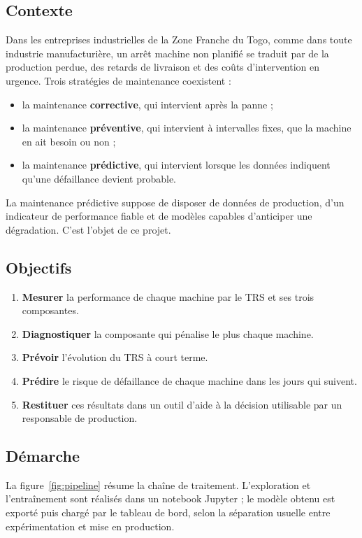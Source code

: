 \documentclass[11pt,a4paper]{article}
\begin{document}
\subsection{Contexte}
Dans les entreprises industrielles de la Zone Franche du Togo, comme dans toute industrie
manufacturière, un arrêt machine non planifié se traduit par de la production perdue, des
retards de livraison et des coûts d'intervention en urgence. Trois stratégies de maintenance
coexistent :
\begin{itemize}
  \item la maintenance \textbf{corrective}, qui intervient après la panne ;
  \item la maintenance \textbf{préventive}, qui intervient à intervalles fixes, que la machine
        en ait besoin ou non ;
  \item la maintenance \textbf{prédictive}, qui intervient lorsque les données indiquent
        qu'une défaillance devient probable.
\end{itemize}
La maintenance prédictive suppose de disposer de données de production, d'un indicateur de
performance fiable et de modèles capables d'anticiper une dégradation. C'est l'objet de ce projet.

\subsection{Objectifs}
\begin{enumerate}
  \item \textbf{Mesurer} la performance de chaque machine par le TRS et ses trois composantes.
  \item \textbf{Diagnostiquer} la composante qui pénalise le plus chaque machine.
  \item \textbf{Prévoir} l'évolution du TRS à court terme.
  \item \textbf{Prédire} le risque de défaillance de chaque machine dans les jours qui suivent.
  \item \textbf{Restituer} ces résultats dans un outil d'aide à la décision utilisable par un
        responsable de production.
\end{enumerate}

\subsection{Démarche}
La figure~\ref{fig:pipeline} résume la chaîne de traitement. L'exploration et l'entraînement
sont réalisés dans un notebook Jupyter ; le modèle obtenu est exporté puis chargé par le tableau
de bord, selon la séparation usuelle entre expérimentation et mise en production.
\end{document}
